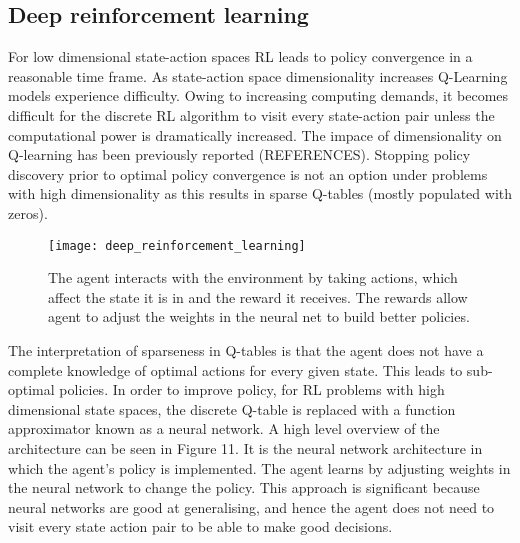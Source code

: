 \subsection{Deep reinforcement learning}
For low dimensional state-action spaces RL leads to policy convergence in a reasonable time frame. As state-action space dimensionality increases Q-Learning models experience difficulty. Owing to increasing computing demands, it becomes difficult for the discrete RL algorithm to visit every state-action pair unless the computational power is dramatically increased. The impace of dimensionality on Q-learning has been previously reported (REFERENCES). Stopping policy discovery prior to optimal policy convergence is not an option under problems with high dimensionality as this results in sparse Q-tables (mostly populated with zeros).
\begin{figure}[ht]
\centering
\texttt{[image: deep\_reinforcement\_learning]}
\caption{The agent interacts with the environment by taking actions, which affect the state it is in and the reward it receives. The rewards allow agent to adjust the weights in the neural net to build better policies.}
\end{figure}

The interpretation of sparseness in Q-tables is that the agent does not have a complete knowledge of optimal actions for every given state. This leads to sub-optimal policies. In order to improve policy, for RL problems with high dimensional state spaces, the discrete Q-table is replaced with a function approximator known as a neural network. A high level overview of the architecture can be seen in Figure 11. It is the neural network architecture in which the agent's policy is implemented. The agent learns by adjusting weights in the neural network to change the policy. This approach is significant because neural networks are good at generalising, and hence the agent does not need to visit every state action pair to be able to make good decisions.